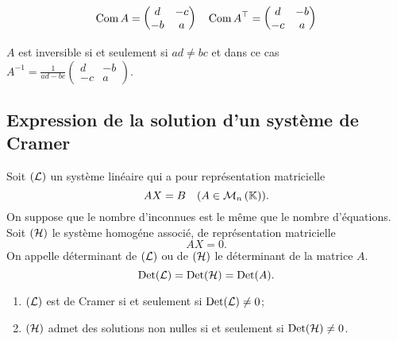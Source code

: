 \begin{equation}
  \operatorname{Com} A =
  \begin{pmatrix}
    d & -c \\
    -b & a
  \end{pmatrix}
  \quad {\operatorname{Com}A}^{\top} =
  \begin{pmatrix}
    d & -b \\
    -c & a
  \end{pmatrix}
\end{equation}

\(A\) est inversible si et seulement si \(ad \neq bc\) et dans ce cas
\(A^{-1} = \frac{1}{ad-bc}
\begin{pmatrix}
  d & -b \\
  -c & a
\end{pmatrix}
\).

\subsection{Expression de la solution d'un système de Cramer}

Soit \((\mathcal{L})\) un système linéaire qui a pour représentation matricielle
\begin{equation}
  AX=B \quad (A \in \mathcal{M}_{n}\left(\mathbb{K}\right)).
\end{equation}
On suppose que le nombre d'inconnues est le même que le nombre
d'équations. Soit \((\mathcal{H})\) le système homogéne associé, de
représentation matricielle
\begin{equation}
  AX=0.
\end{equation}
On appelle déterminant de \((\mathcal{L})\) ou de \((\mathcal{H})\) le déterminant de la
matrice \(A\).
\begin{equation}
  \operatorname{Det}(\mathcal{L})=\operatorname{Det}(\mathcal{H})=\operatorname{Det}(A).
\end{equation}

\begin{prop}
  \begin{enumerate}
    \item \((\mathcal{L})\) est de Cramer si et seulement si \(\operatorname{Det}(\mathcal{L}) \neq
      0\);
    \item \((\mathcal{H})\) admet des solutions non nulles si et seulement si
      \(\operatorname{Det}(\mathcal{H}) \neq 0\).
  \end{enumerate}
\end{prop}

